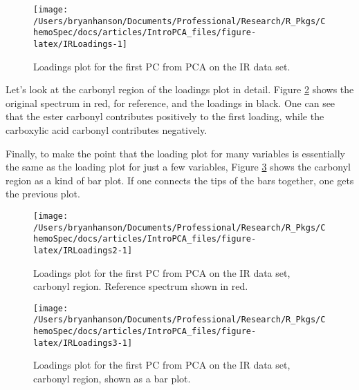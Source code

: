 \documentclass[10pt,twocolumn,twoside,]{pinp}
\begin{document}
\begin{figure}

{\centering \texttt{[image: /Users/bryanhanson/Documents/Professional/Research/R\_Pkgs/ChemoSpec/docs/articles/IntroPCA\_files/figure-latex/IRLoadings-1]} 

}

\caption{Loadings plot for the first PC from PCA on the IR data set.\label{fig:IRLoadings}}\label{fig:IRLoadings}
\end{figure}

Let's look at the carbonyl region of the loadings plot in detail. Figure
\ref{fig:IRLoadings2} shows the original spectrum in red, for reference,
and the loadings in black. One can see that the ester carbonyl
contributes positively to the first loading, while the carboxylic acid
carbonyl contributes negatively.

Finally, to make the point that the loading plot for many variables is
essentially the same as the loading plot for just a few variables,
Figure \ref{fig:IRLoadings3} shows the carbonyl region as a kind of bar
plot. If one connects the tips of the bars together, one gets the
previous plot.

\begin{figure}

{\centering \texttt{[image: /Users/bryanhanson/Documents/Professional/Research/R\_Pkgs/ChemoSpec/docs/articles/IntroPCA\_files/figure-latex/IRLoadings2-1]} 

}

\caption{Loadings plot for the first PC from PCA on the IR data set, carbonyl region. Reference spectrum shown in red.\label{fig:IRLoadings2}}\label{fig:IRLoadings2}
\end{figure}

\begin{figure}

{\centering \texttt{[image: /Users/bryanhanson/Documents/Professional/Research/R\_Pkgs/ChemoSpec/docs/articles/IntroPCA\_files/figure-latex/IRLoadings3-1]} 

}

\caption{Loadings plot for the first PC from PCA on the IR data set, carbonyl region, shown as a bar plot.\label{fig:IRLoadings3}}\label{fig:IRLoadings3}
\end{figure}

\end{document}
